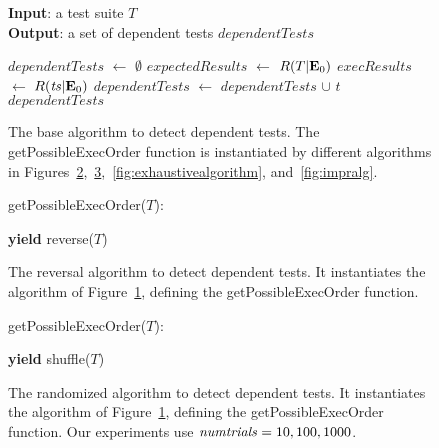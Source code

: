 \begin{figure}[t]
\textbf{Input}: a test suite $\mathit{T}$\\
\textbf{Output}: a set of dependent tests $\mathit{dependentTests}$\\
\bigsqueeze
\begin{algorithmic}[1]
\STATE $\mathit{dependentTests}$ $\leftarrow$ $\emptyset$
\STATE $\mathit{expectedResults}$ $\leftarrow$ $R(T|\mathbf{E}_0)$
\STATE $\mathit{execResults}$ $\leftarrow$ $R(\mathit{ts}|\mathbf{E}_0)$
\STATE $\mathit{dependentTests}$ $\leftarrow$ $\mathit{dependentTests}$ $\cup$ $\mathit{t}$
\ENDIF
\ENDFOR
\ENDFOR
\RETURN $\mathit{dependentTests}$
\end{algorithmic}


\caption {The base algorithm to detect dependent tests.
$\!$The getPossibleExecOrder function is instantiated
by different algorithms in
Figures~\ref{fig:reversal-algorithm},~$\!$\ref{fig:randalgorithm},~$\!$\ref{fig:exhaustivealgorithm},
and~\ref{fig:impralg}.
}
\label{fig:basealgorithm}
\end{figure}

\begin{figure}[t]
getPossibleExecOrder($T$):\\
\bigsqueeze
\begin{algorithmic}[1]
\STATE \textbf{yield} reverse($T$)
\end{algorithmic}

\caption {The reversal algorithm to detect dependent tests.
It instantiates the algorithm of Figure~\ref{fig:basealgorithm},
defining the getPossibleExecOrder function.
}
\label{fig:reversal-algorithm}
\smallsqueeze
\end{figure}


\begin{figure}[t]
getPossibleExecOrder($T$):\\
\bigsqueeze
\begin{algorithmic}[1]
\STATE \textbf{yield} shuffle($T$)
\ENDFOR
\end{algorithmic}
\caption {The randomized algorithm to detect dependent tests.
It instantiates the algorithm of Figure~\ref{fig:basealgorithm}, defining
the getPossibleExecOrder function.
Our experiments use $\mathit{numtrials} = 10,
100, 1000$.}
\label{fig:randalgorithm}
\end{figure}

